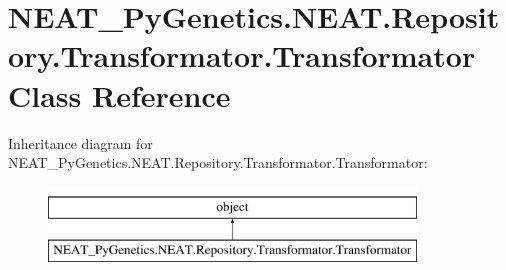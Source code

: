 \hypertarget{class_n_e_a_t___py_genetics_1_1_n_e_a_t_1_1_repository_1_1_transformator_1_1_transformator}{}\section{N\+E\+A\+T\+\_\+\+Py\+Genetics.\+N\+E\+A\+T.\+Repository.\+Transformator.\+Transformator Class Reference}
\label{class_n_e_a_t___py_genetics_1_1_n_e_a_t_1_1_repository_1_1_transformator_1_1_transformator}
Inheritance diagram for N\+E\+A\+T\+\_\+\+Py\+Genetics.\+N\+E\+A\+T.\+Repository.\+Transformator.\+Transformator\+:\begin{figure}[H]
\begin{center}
\leavevmode
\includegraphics[height=2.000000cm]{class_n_e_a_t___py_genetics_1_1_n_e_a_t_1_1_repository_1_1_transformator_1_1_transformator}
\end{center}
\end{figure}

